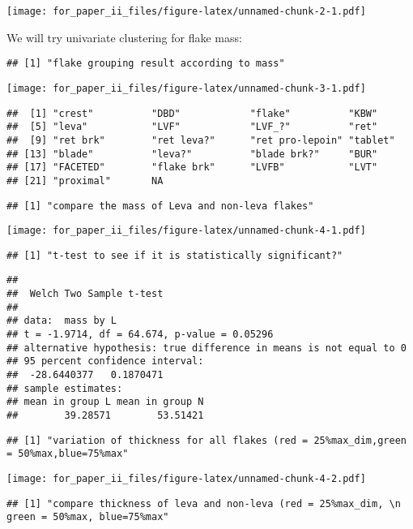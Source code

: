 \documentclass[]{article}
\begin{document}
\texttt{[image: for\_paper\_ii\_files/figure-latex/unnamed-chunk-2-1.pdf]}

We will try univariate clustering for flake mass:

\begin{verbatim}
## [1] "flake grouping result according to mass"
\end{verbatim}

\texttt{[image: for\_paper\_ii\_files/figure-latex/unnamed-chunk-3-1.pdf]}

\begin{verbatim}
##  [1] "crest"          "DBD"            "flake"          "KBW"           
##  [5] "leva"           "LVF"            "LVF_?"          "ret"           
##  [9] "ret brk"        "ret leva?"      "ret pro-lepoin" "tablet"        
## [13] "blade"          "leva?"          "blade brk?"     "BUR"           
## [17] "FACETED"        "flake brk"      "LVFB"           "LVT"           
## [21] "proximal"       NA
\end{verbatim}

\begin{verbatim}
## [1] "compare the mass of Leva and non-leva flakes"
\end{verbatim}

\texttt{[image: for\_paper\_ii\_files/figure-latex/unnamed-chunk-4-1.pdf]}

\begin{verbatim}
## [1] "t-test to see if it is statistically significant?"
\end{verbatim}

\begin{verbatim}
## 
##  Welch Two Sample t-test
## 
## data:  mass by L
## t = -1.9714, df = 64.674, p-value = 0.05296
## alternative hypothesis: true difference in means is not equal to 0
## 95 percent confidence interval:
##  -28.6440377   0.1870471
## sample estimates:
## mean in group L mean in group N 
##        39.28571        53.51421
\end{verbatim}

\begin{verbatim}
## [1] "variation of thickness for all flakes (red = 25%max_dim,green = 50%max,blue=75%max"
\end{verbatim}

\texttt{[image: for\_paper\_ii\_files/figure-latex/unnamed-chunk-4-2.pdf]}

\begin{verbatim}
## [1] "compare thickness of leva and non-leva (red = 25%max_dim, \n      green = 50%max, blue=75%max"
\end{verbatim}
\end{document}
